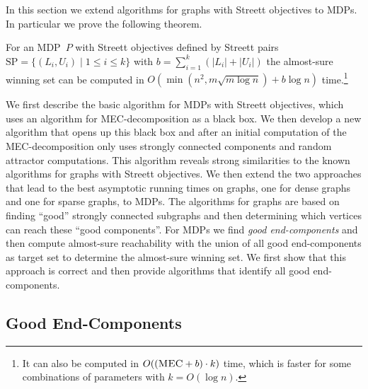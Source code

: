 \documentclass[11pt,letterpaper]{article}
\newcommand{\SP}{\mathrm{SP}}
\newcommand{\mdp}{P\xspace}
\newif\iffullversion
\newcommand{\infull}[1]{\iffullversion #1\fi}
\begin{document}
In this section we extend algorithms for graphs with Streett objectives to MDPs. 
In particular we prove the following theorem.
\begin{theorem}
	For an MDP~$\mdp$ with Streett objectives defined by Streett pairs 
	$\SP= \{(L_i, U_i) \mid 1 \le i \le k\}$ with 
	$b = \sum_{i=1}^k (\lvert L_i \rvert + \lvert U_i \rvert)$
	the almost-sure winning set can be computed in $O(\min(n^2, m \sqrt{m \log n})
	+ b \log n)$ time.\footnote{It can also be computed in 
	$O((\textsc{MEC} + b) \cdot k)$ time, which is faster for some combinations
	of parameters with $k = O(\log n)$.}
\end{theorem}

We first describe the basic algorithm for MDPs with Streett objectives, which 
uses an algorithm for MEC-decomposition as a black box. We then develop a new 
algorithm that opens up this black box and after an initial computation of the 
MEC-decomposition only uses strongly connected components
and random attractor computations\infull{ (Section~\ref{sec:streettimpr})}. 
This algorithm reveals strong similarities to the known algorithms for graphs 
with Streett objectives. We then extend the two approaches that lead to the best
asymptotic running times on graphs, one for dense 
graphs\infull{ (Section~\ref{sec:streettdense})} 
and one for sparse\infull{ (Section~\ref{sec:streettdense})}
graphs, to MDPs. The algorithms for graphs are based on finding
``good'' strongly connected subgraphs and then determining which vertices can
reach these ``good components''. For MDPs we find \emph{good end-components}
and then compute almost-sure reachability with the union of all good 
end-components as target set
to determine the almost-sure winning set.
We first show that this approach is correct\infull{ 
(Section~\ref{sec:gec}, see also~\cite[Chap.~10.6.3]{baierbook})}
and then provide algorithms that identify all good end-components.

\subsection{Good End-Components}\label{sec:gec}
\end{document}
